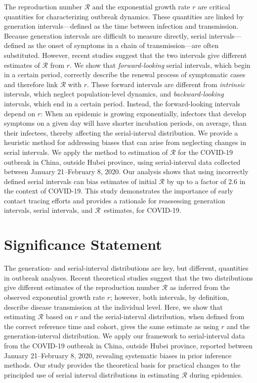 \documentclass[12pt]{article}
\newcommand{\RR}{\ensuremath{{\mathcal R}}\xspace}
\begin{document}
The reproduction number \RR and the exponential growth rate $r$ are critical quantities for characterizing outbreak dynamics.
These quantities are linked by generation intervals---defined as the time between infection and transmission.
Because generation intervals are difficult to measure directly, serial intervals---defined as the onset of symptoms in a chain of transmission---are often substituted.
However, recent studies suggest that the two intervals give different estimates of \RR from $r$.
We show that \emph{forward-looking} serial intervals, which begin in a certain period, correctly describe the renewal process of symptomatic cases and therefore link \RR with $r$.
These forward intervals are different from \emph{intrinsic} intervals, which neglect population-level dynamics, and \emph{backward-looking} intervals, which end in a certain period.
Instead, the forward-looking intervals depend on $r$:
When an epidemic is growing exponentially, infectors that develop symptoms on a given day will have shorter incubation periods, on average, than their infectees, thereby affecting the serial-interval distribution.
We provide a heuristic method for addressing biases that can arise from neglecting changes in serial intervals. 
We apply the method to estimation of \RR for the COVID-19 outbreak in China, outside Hubei province, using serial-interval data collected between January 21--February 8, 2020. 
Our analysis shows that using incorrectly defined serial intervals can bias estimates of initial \RR by up to a factor of 2.6 in the context of COVID-19.
This study demonstrates the importance of early contact tracing efforts and provides a rationale for reassessing generation intervals, serial intervals, and \RR\ estimates, for COVID-19.

\section*{Significance Statement}

The generation- and serial-interval distributions are key, but different, quantities in outbreak analyses.
Recent theoretical studies suggest that the two distributions give different estimates of the reproduction number \RR as inferred from the observed exponential growth rate $r$;
however, both intervals, by definition, describe disease transmission at the individual level.
Here, we show that estimating \RR based on $r$ and the serial-interval distribution, when defined from the correct reference time and cohort, gives the same estimate as using $r$ and the generation-interval distribution.
We apply our framework to serial-interval data from the COVID-19 outbreak in China, outside Hubei province, reported between January  21--February 8, 2020, revealing systematic biases in prior inference methods.
Our study provides the theoretical basis for practical changes to the principled use of serial interval distributions in estimating \RR during epidemics.
\end{document}
